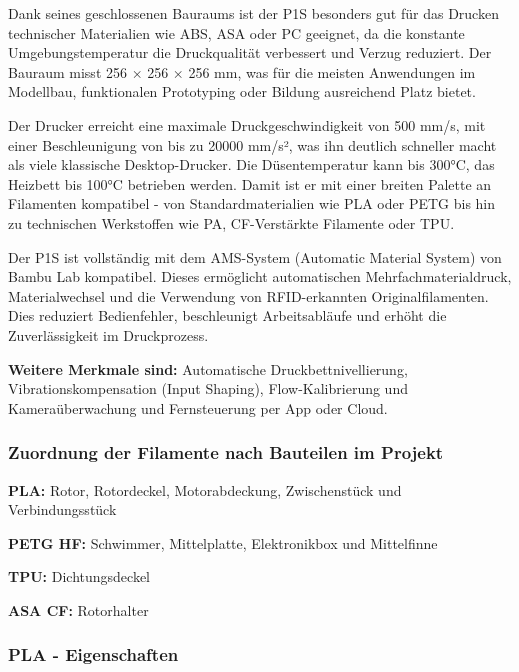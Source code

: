\documentclass[a4paper,12pt]{article}
\begin{document}
Dank seines geschlossenen Bauraums ist der P1S besonders gut für das Drucken technischer Materialien wie ABS, ASA oder PC geeignet, da die konstante Umgebungstemperatur die Druckqualität verbessert und Verzug reduziert. Der Bauraum misst 256 × 256 × 256 mm, was für die meisten Anwendungen im Modellbau, funktionalen Prototyping oder Bildung ausreichend Platz bietet.

Der Drucker erreicht eine maximale Druckgeschwindigkeit von 500 mm/s, mit einer Beschleunigung von bis zu 20000 mm/s², was ihn deutlich schneller macht als viele klassische Desktop-Drucker. Die Düsentemperatur kann bis 300°C, das Heizbett bis 100°C betrieben werden. Damit ist er mit einer breiten Palette an Filamenten kompatibel - von Standardmaterialien wie PLA oder PETG bis hin zu technischen Werkstoffen wie PA, CF-Verstärkte Filamente oder TPU.

Der P1S ist vollständig mit dem AMS-System (Automatic Material System) von Bambu Lab kompatibel. Dieses ermöglicht automatischen Mehrfachmaterialdruck, Materialwechsel und die Verwendung von RFID-erkannten Originalfilamenten. Dies reduziert Bedienfehler, beschleunigt Arbeitsabläufe und erhöht die Zuverlässigkeit im Druckprozess.\newline

\textbf{Weitere Merkmale sind:} Automatische Druckbettnivellierung, Vibrationskompensation (Input Shaping), Flow-Kalibrierung und Kameraüberwachung und Fernsteuerung per App oder Cloud.\cite{Bambu_Lab_Drucker_P1S}

\newpage

\subsubsection{Zuordnung der Filamente nach Bauteilen im Projekt}

\textbf{PLA:}
Rotor, Rotordeckel, Motorabdeckung, Zwischenstück und Verbindungsstück\newline

\textbf{PETG HF:}
Schwimmer, Mittelplatte, Elektronikbox und Mittelfinne\newline

\textbf{TPU:}
Dichtungsdeckel\newline

\textbf{ASA CF:}
Rotorhalter\newline


\subsubsection{PLA - Eigenschaften}
\end{document}
